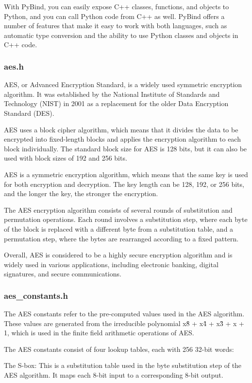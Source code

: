 \documentclass{article}
\begin{document}
With PyBind, you can easily expose C++ classes, functions, and objects to Python, and you can call Python code from C++ as well.
PyBind offers a number of features that make it easy to work with both languages, such as automatic type conversion and the ability to use Python classes and objects in C++ code.

\subsubsection{aes.h}
AES, or Advanced Encryption Standard, is a widely used symmetric encryption algorithm.
It was established by the National Institute of Standards and Technology (NIST) in 2001 as a replacement for the older Data Encryption Standard (DES).

AES uses a block cipher algorithm, which means that it divides the data to be encrypted into fixed-length blocks and applies the encryption algorithm to each block individually.
The standard block size for AES is 128 bits, but it can also be used with block sizes of 192 and 256 bits.

AES is a symmetric encryption algorithm, which means that the same key is used for both encryption and decryption.
The key length can be 128, 192, or 256 bits, and the longer the key, the stronger the encryption.

The AES encryption algorithm consists of several rounds of substitution and permutation operations.
Each round involves a substitution step, where each byte of the block is replaced with a different byte from a substitution table, and a permutation step, where the bytes are rearranged according to a fixed pattern.

Overall, AES is considered to be a highly secure encryption algorithm and is widely used in various applications, including electronic banking, digital signatures, and secure communications.
\subsubsection{aes\_constants.h}
The AES constants refer to the pre-computed values used in the AES algorithm.
These values are generated from the irreducible polynomial x\^8 + x\^4 + x\^3 + x + 1, which is used in the finite field arithmetic operations of AES.

The AES constants consist of four lookup tables, each with 256 32-bit words:

The S-box: This is a substitution table used in the byte substitution step of the AES algorithm. It maps each 8-bit input to a corresponding 8-bit output.
\end{document}
